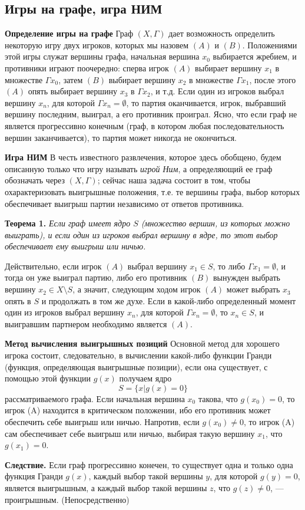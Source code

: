 \subsection{Игры на графе, игра НИМ}

\textbf{Определение игры на графе}
Граф $(X, \Gamma)$ дает возможность определить некоторую игру двух игроков, которых мы назовем $(A)$ и $(B)$. Положениями этой игры служат вершины графа, начальная вершина $x_0$ выбирается жребием, и противники играют поочередно: сперва игрок $(A)$ выбирает вершину $x_1$ в множестве $\Gamma x_0$, затем $(B)$ выбирает вершину $x_2$ в множестве $\Gamma x_1$, после этого $(A)$ опять выбирает вершину $x_3$ в $\Gamma x_2$, и т.д. Если один из игроков выбрал вершину $x_n$, для которой $\Gamma x_n = \emptyset$, то партия оканчивается, игрок, выбравший вершину последним, выиграл, а его противник проиграл. Ясно, что если граф не является прогрессивно конечным (граф, в котором любая последовательность вершин заканчивается), то партия может никогда не окончиться.

\textbf{Игра НИМ}
В честь известного развлечения, которое здесь обобщено, будем описанную только что игру называть \textit{игрой Ним}, а определяющий ее граф обозначать через $(X, \Gamma)$; сейчас наша задача состоит в том, чтобы охарактеризовать выигрышные положения, т.е. те вершины графа, выбор которых обеспечивает выигрыш партии независимо от ответов противника.

\textbf{Теорема 1.} \textit{Если граф имеет ядро $S$ (множество вершин, из которых можно выиграть), и если один из игроков выбрал вершину в ядре, то этот выбор обеспечивает ему выигрыш или ничью.}

Действительно, если игрок $(A)$ выбрал вершину $x_1 \in S$, то либо $\Gamma x_1 = \emptyset$, и тогда он уже выиграл партию, либо его противник $(B)$ вынужден выбрать вершину $x_2 \in X \setminus S$, а значит, следующим ходом игрок $(A)$ может выбрать $x_3$ опять в $S$ и продолжать в том же духе. Если в какой-либо определенный момент один из игроков выбрал вершину $x_n$, для которой $\Gamma x_n = \emptyset$, то $x_n \in S$, и выигравшим партнером необходимо является $(A)$.

\textbf{Метод вычисления выигрышных позиций}
Основной метод для хорошего игрока состоит, следовательно, в вычислении какой-либо функции Гранди (функция, определяющая выигрышные позиции), если она существует, с помощью этой функции \( g(x) \) получаем ядро
\[
S = \{ x | g(x) = 0 \}
\]
рассматриваемого графа. Если начальная вершина \( x_0 \) такова, что \( g(x_0) = 0 \), то игрок (A) находится в критическом положении, ибо его противник может обеспечить себе выигрыш или ничью. Напротив, если \( g(x_0) \neq 0 \), то игрок (A) сам обеспечивает себе выигрыш или ничью, выбирая такую вершину \( x_1 \), что \( g(x_1) = 0 \).

\textbf{Следствие.} Если граф прогрессивно конечен, то существует одна и только одна функция Гранди \( g(x) \), каждый выбор такой вершины \( y \), для которой \( g(y) = 0 \), является выигрышным, а каждый выбор такой вершины \( z \), что \( g(z) \neq 0 \), — проигрышным. (Непосредственно)

